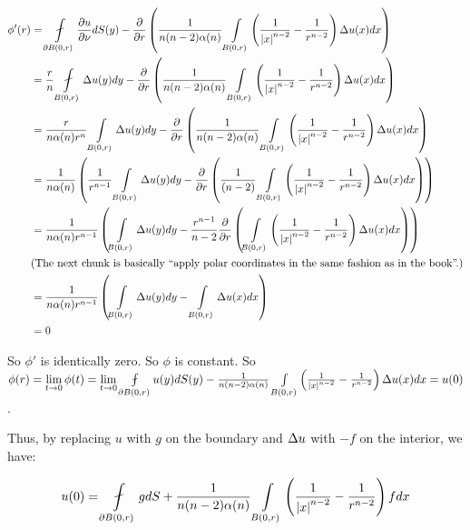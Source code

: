 \documentclass[a4paper,12pt]{article}
\begin{document}
\begin{align*}
\phi'(r) &= \fint\limits_{\partial B(0,r)} \frac{\partial u}{\partial \nu} dS(y) - \frac{\partial}{\partial r} \left(\frac{1}{n(n-2)\al(n)} \int\limits_{B(0,r)} \left(\frac{1}{\absval{x}^{n-2}} - \frac{1}{r^{n-2}}\right) \De u(x) dx\right)\\
&= \frac{r}{n}\fint\limits_{B(0,r)} \De u(y)dy - \frac{\partial}{\partial r} \left(\frac{1}{n(n-2)\al(n)} \int\limits_{B(0,r)} \left(\frac{1}{\absval{x}^{n-2}} - \frac{1}{r^{n-2}}\right) \De u(x) dx\right)\\
&= \frac{r}{n\al(n)r^n}\int\limits_{B(0,r)} \De u(y)dy - \frac{\partial}{\partial r} \left(\frac{1}{n(n-2)\al(n)} \int\limits_{B(0,r)} \left(\frac{1}{\absval{x}^{n-2}} - \frac{1}{r^{n-2}}\right) \De u(x) dx\right)\\
&= \frac{1}{n\al(n)}\left(\frac{1}{r^{n-1}}\int\limits_{B(0,r)} \De u(y)dy - \frac{\partial}{\partial r} \left(\frac{1}{(n-2)} \int\limits_{B(0,r)} \left(\frac{1}{\absval{x}^{n-2}} - \frac{1}{r^{n-2}}\right) \De u(x) dx\right)\right)\\
&= \frac{1}{n\al(n)r^{n-1}}\left(\int\limits_{B(0,r)} \De u(y)dy - \frac{r^{n-1}}{n-2}\frac{\partial}{\partial r} \left( \int\limits_{B(0,r)} \left(\frac{1}{\absval{x}^{n-2}} - \frac{1}{r^{n-2}}\right) \De u(x) dx\right)\right)\\
& \text{(The next chunk is basically ``apply polar coordinates in the same fashion as in the book''.)}\\
&= \frac{1}{n\al(n)r^{n-1}}\left(\int\limits_{B(0,r)} \De u(y)dy - \int\limits_{B(0,r)} \De u(x)dx \right)\\
&= 0 \\ %
\end{align*}



So $\phi'$ is identically zero. So $\phi$ is constant. So $\phi(r) = \lim\limits_{t \to 0} \phi(t) = \lim\limits_{t \to 0} \fint\limits_{\partial B(0,r)} u(y) dS(y) - \frac{1}{n(n-2)\al(n)} \int\limits_{B(0,r)} \left(\frac{1}{\absval{x}^{n-2}} - \frac{1}{r^{n-2}}\right) \De u(x) dx = u(0)$.

Thus, by replacing $u$ with $g$ on the boundary and $\Delta u$ with $-f$ on the interior, we have: 

\begin{displaymath}
u(0) = \fint \limits_{\partial B(0,r)} g dS + \frac{1}{n(n-2)\al(n)} \int\limits_{B(0,r)} \left(\frac{1}{\absval{x}^{n-2}} - \frac{1}{r^{n-2}}\right) f dx
\end{displaymath}
\end{document}
